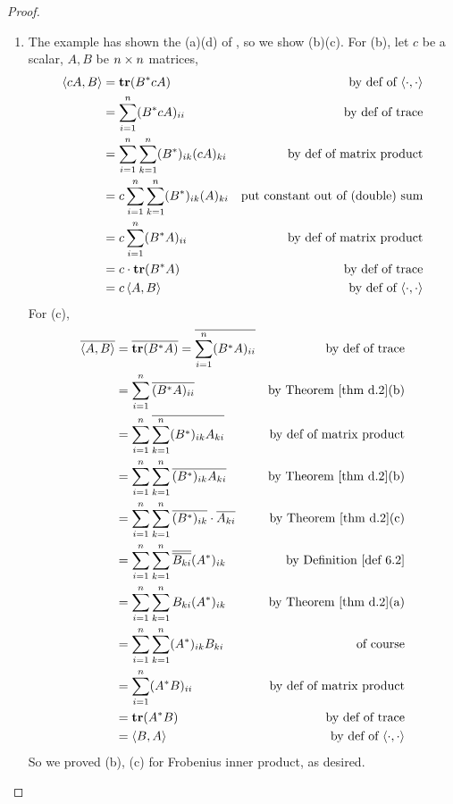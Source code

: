 \begin{proof} \ 

\begin{enumerate}
\item The example has shown the (a)(d) of , so we show (b)(c).
For (b), let \(c\) be a scalar, \(A, B\) be \(n \times n\) matrices,
\begin{align*}
    \left< cA, B \right> & = \textbf{tr}(B^* cA) & \text{by def of \(\left<\cdot, \cdot \right>\)} \\
        & = \sum_{i = 1}^n (B^* cA)_{ii} & \text{by def of trace} \\
        & = \sum_{i = 1}^n \sum_{k = 1}^n (B^*)_{ik} (cA)_{ki} & \text{by def of matrix product} \\
        & = c \sum_{i = 1}^n \sum_{k = 1}^n (B^*)_{ik} (A)_{ki} & \text{put constant out of (double) sum} \\
        & = c \sum_{i = 1}^n (B^* A)_{ii} & \text{by def of matrix product} \\
        & = c \cdot \textbf{tr}(B^* A) & \text{by def of trace} \\
        & = c \left< A, B \right> & \text{by def of \(\left<\cdot, \cdot \right>\)}
\end{align*}
For (c),
\begin{align*}
    \conjugatet{\LG A, B \RG} & = \conjugatet{\TRACE(B^* A)} = \conjugatet{\sum_{i = 1}^n (B^* A)_{ii}} & \text{by def of trace} \\
        & = \sum_{i = 1}^n \conjugatet{(B^* A)_{ii}} & \text{by \THM{d.2}(b)} \\
        & = \sum_{i = 1}^n \conjugatet{\sum_{k = 1}^n (B^*)_{ik} A_{ki}} & \text{by def of matrix product} \\
        & = \sum_{i = 1}^n \sum_{k = 1}^n \conjugatet{(B^*)_{ik} A_{ki}} & \text{by \THM{d.2}(b)} \\
        & = \sum_{i = 1}^n \sum_{k = 1}^n \conjugatet{(B^*)_{ik}} \cdot \conjugatet{A_{ki}} & \text{by \THM{d.2}(c)} \\
        & = \sum_{i = 1}^n \sum_{k = 1}^n \conjugatet{\conjugatet{B_{ki}}} (A^*)_{ik} & \text{by \DEF{6.2}} \\
        & = \sum_{i = 1}^n \sum_{k = 1}^n B_{ki} (A^*)_{ik} & \text{by \THM{d.2}(a)} \\
        & = \sum_{i = 1}^n \sum_{k = 1}^n (A^*)_{ik} B_{ki} & \text{of course} \\
        & = \sum_{i = 1}^n (A^* B)_{ii} & \text{by def of matrix product} \\
        & = \TRACE(A^* B) & \text{by def of trace} \\
        & = \LG B, A \RG & \text{by def of \(\InnerOp\)}
\end{align*}
So we proved (b), (c) for Frobenius inner product, as desired.


\end{enumerate}
\end{proof}
